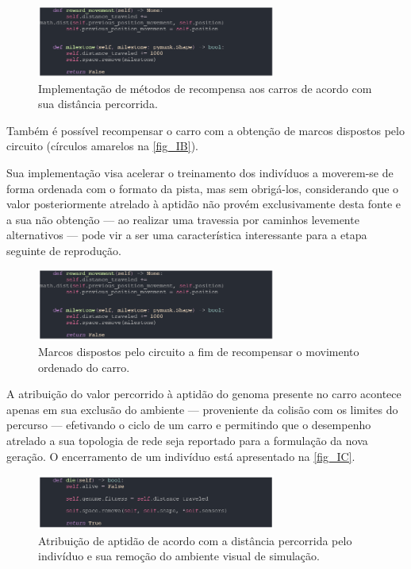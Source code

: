 \begin{figure}[htb]
        \centering
        \caption{\label{fig_IA}Implementação de métodos de recompensa aos carros de acordo com sua distância percorrida.}
        \includegraphics[width=0.7\textwidth]{images/IA.png}
\end{figure}

Também é possível recompensar o carro com a obtenção de marcos dispostos pelo circuito (círculos amarelos na \autoref{fig_IB}). 

Sua implementação visa acelerar o treinamento dos indivíduos a moverem-se de forma ordenada com o
formato da pista, mas sem obrigá-los, considerando que o valor posteriormente atrelado à aptidão não
provém exclusivamente desta fonte e a sua não obtenção — ao realizar uma travessia por caminhos levemente
alternativos — pode vir a ser uma característica interessante para a etapa seguinte de reprodução.

\begin{figure}[htb]
        \centering
        \caption{\label{fig_IB}Marcos dispostos pelo circuito a fim de recompensar o movimento ordenado do carro.}
        \includegraphics[width=0.7\textwidth]{images/IB.png}
\end{figure}

A atribuição do valor percorrido à aptidão do genoma presente no carro acontece apenas em sua exclusão do ambiente
— proveniente da colisão com os limites do percurso — efetivando o ciclo de um carro e permitindo que o desempenho atrelado a
sua topologia de rede seja reportado para a formulação da nova geração. O encerramento de um indivíduo está apresentado na \autoref{fig_IC}.

\begin{figure}[htb]
        \centering
        \caption{\label{fig_IC}Atribuição de aptidão de acordo com a distância percorrida pelo indivíduo e sua remoção do ambiente visual de simulação.}
        \includegraphics[width=0.7\textwidth]{images/IC.png}
\end{figure}

